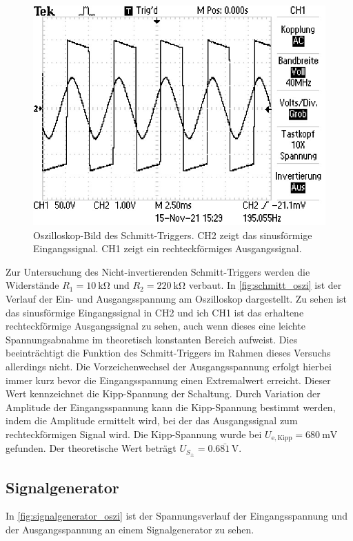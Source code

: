 \begin{figure}[H]
  \centering
  \includegraphics{data/ALL0066/F0066TEK.JPG}
  \caption{Oszilloskop-Bild des Schmitt-Triggers. CH2 zeigt das sinusförmige Eingangssignal. CH1 zeigt ein rechteckförmiges Ausgangssignal.}
  \label{fig:schmitt_oszi}
\end{figure}

Zur Untersuchung des Nicht-invertierenden Schmitt-Triggers werden die Widerstände $R_1 = \SI{10}{\kilo\ohm}$ und $R_2 = \SI{220}{\kilo\ohm}$ verbaut. In \autoref{fig:schmitt_oszi} ist der Verlauf der Ein- und Ausgangsspannung am Oszilloskop dargestellt. Zu sehen ist das sinusförmige Eingangssignal in CH2 und ich CH1 ist das erhaltene rechteckförmige Ausgangssignal zu sehen, auch wenn dieses eine leichte Spannungsabnahme im theoretisch konstanten Bereich aufweist. Dies beeinträchtigt die Funktion des Schmitt-Triggers im Rahmen dieses Versuchs allerdings nicht. Die Vorzeichenwechsel der Ausgangsspannung erfolgt hierbei immer kurz bevor die Eingangsspannung einen Extremalwert erreicht. Dieser Wert kennzeichnet die Kipp-Spannung der Schaltung. Durch Variation der Amplitude der Eingangsspannung kann die Kipp-Spannung bestimmt werden, indem die Amplitude ermittelt wird, bei der das Ausgangssignal zum rechteckförmigen Signal wird. Die Kipp-Spannung wurde bei $U_{\mathrm{e, Kipp}} = \SI{680}{\milli\volt}$ gefunden. Der theoretische Wert beträgt $U_{S_{\pm}} = 0.6\bar{81} \, \si{\volt}$.

\newpage
\subsection{Signalgenerator}
In \autoref{fig:signalgenerator_oszi} ist der Spannungsverlauf der Eingangsspannung und der Ausgangsspannung an einem Signalgenerator zu sehen.

